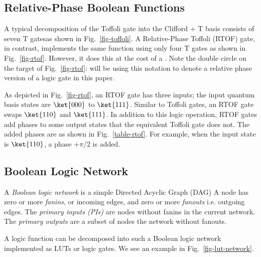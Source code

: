 \documentclass[paper]{ieice}
\providecommand{\DIFadd}[1]{{\protect\color{blue}{#1}}} %
\providecommand{\DIFaddbegin}{} %
\providecommand{\DIFaddend}{} %
\newcommand{\DIFaddincludegraphics}[2][]{{\color{blue}\fbox{\DIFOincludegraphics[#1]{#2}}}} %
\DeclareRobustCommand{\DIFaddbegin}{\DIFOaddbegin \let\includegraphics\DIFaddincludegraphics} %
\DeclareRobustCommand{\DIFaddend}{\DIFOaddend \let\includegraphics\DIFOincludegraphics} %
\begin{document}
\subsection{Relative-Phase Boolean Functions}
\vspace*{-2mm}
A typical decomposition of the Toffoli gate into the Clifford + T basis
consists of seven T gates\DIFaddbegin \DIFadd{, }\DIFaddend as shown in Fig.~\ref{fig-toffoli}.
A Relative-Phase Toffoli (RTOF) gate\DIFaddbegin \DIFadd{\mbox{%
\cite{bib-selinger-rtof}}\hskip0pt%
 }\DIFaddend , in contrast,
implements the same function using only four T gates as shown in
Fig.~\ref{fig-rtof}. However, it does this at the cost of a  \DIFaddbegin \DIFadd{relative phase }\DIFaddend .
Note the double circle on the target of Fig.~\ref{fig-rtof}:  \DIFaddbegin \DIFadd{We }\DIFaddend will be
using this notation to denote a relative phase version of a \DIFaddbegin \DIFadd{quantum }\DIFaddend logic
gate in this paper. 

As depicted in Fig.~\ref{fig-rtof}, an RTOF gate has three inputs; the input quantum basis states are $\ket{000}$
to $\ket{111}$. Similar to Toffoli gates, an RTOF gate swaps $\ket{110}$ and $\ket{111}$. In addition to this
logic operation, RTOF gates add phases to some output states that the equivalent Toffoli gate does not. The added
phases are as shown in Fig.~\ref{table-rtof}. For example, when the input state is $\ket{110}$, a phase $+\pi/2$ is
added.

\subsection{Boolean Logic Network}

A {\it Boolean logic network} is a simple Directed Acyclic Graph (DAG) \DIFaddbegin \DIFadd{.
 }\DIFaddend A node has zero or more {\it fanins}, or incoming edges, and zero or more {\it fanouts} i.e. outgoing edges. The {\it primary inputs (PIs)} are nodes without fanins in the current network. The {\it primary outputs} are a subset of nodes  \DIFaddbegin \DIFadd{in }\DIFaddend the network without fanouts. 

A logic function can be decomposed into such a Boolean logic network \DIFaddbegin \DIFadd{. Its nodes can subsequently be
 }\DIFaddend implemented as LUTs or logic gates. We see an example in Fig.~\ref{fig-lut-network}. \DIFaddbegin \DIFadd{Here, the nodes are
numbered 1-5 to abstract away the functions inside of them, the primary outputs are labeled $y_1$ and
$y_2$, and the primary inputs are labeled $x_1,\cdots,x_5$. We read this graph as follows: node 1 is
dependent on $x_2$ and $x_3$, and node 2 is dependent on $x_4$ and $x_5$. node 3 is in turn dependent
on node 1 and $x_1$, and node 4 is dependent on both nodes 1 and 2. Finally, node 5 is dependent on both
node 4 and $x_5$.
 }\DIFaddend 
\end{document}
